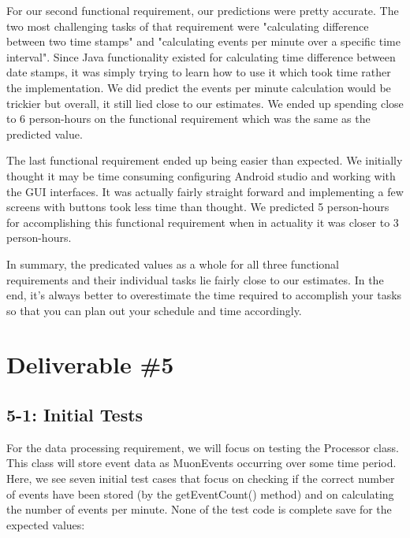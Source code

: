 \documentclass[11pt,a4paper]{article}
\begin{document}
For our second functional requirement, our predictions were pretty accurate. The two most challenging tasks of that requirement were "calculating difference between two time stamps" and "calculating events per minute over a specific time interval". Since Java functionality existed for calculating time difference between date stamps, it was simply trying to learn how to use it which took time rather the implementation. We did predict the events per minute calculation would be trickier but overall, it still lied close to our estimates. We ended up spending close to 6 person-hours on the functional requirement which was the same as the predicted value.

The last functional requirement ended up being easier than expected. We initially thought it may be time consuming configuring Android studio and working with the GUI interfaces. It was actually fairly straight forward and implementing a few screens with buttons took less time than thought. We predicted 5 person-hours for accomplishing this functional requirement when in actuality it was closer to 3 person-hours. 

In summary, the predicated values as a whole for all three functional requirements and their individual tasks lie fairly close to our estimates. In the end, it's always better to overestimate the time required to accomplish your tasks so that you can plan out your schedule and time accordingly.






\newpage
\section*{Deliverable \#5}

\subsection*{5-1: Initial Tests}

For the data processing requirement, we will focus on testing the Processor class. This class will store event data as MuonEvents occurring over some time period. Here, we see seven initial test cases that focus on checking if the correct number of events have been stored (by the getEventCount() method) and on calculating the number of events per minute. None of the test code is complete save for the expected values:
\end{document}
